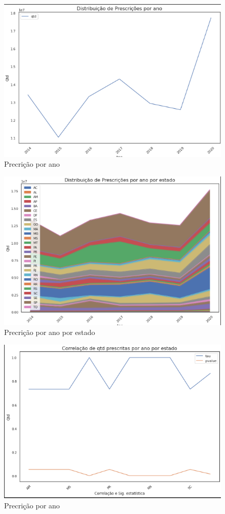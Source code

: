     \begin{figure}[!ht]
        \centering
        \includegraphics[width=0.8\linewidth]{04-figuras/distribuicao_presc_ano.png}
        \caption{Precrição por ano}
        \label{fig:presc_ano}
    \end{figure}
    \begin{figure}[!ht]
        \centering
        \includegraphics[width=0.8\linewidth]{04-figuras/distribuicao_presc_ano_estado.png}
        \caption{Precrição por ano por estado}
        \label{fig:presc_ano_estadp}
    \end{figure}
    \begin{figure}[!ht]
        \centering
        \includegraphics[width=0.8\linewidth]{04-figuras/corelaticao_estados.png}
        \caption{Precrição por ano}
        \label{fig:tau}
    \end{figure}


